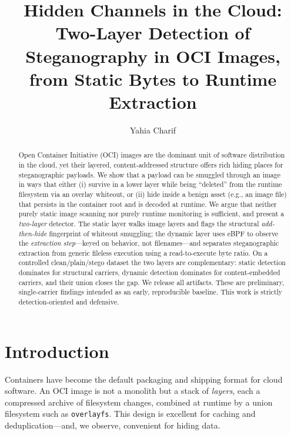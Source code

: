 \documentclass[sigconf,nonacm]{acmart}
\begin{document}
\title{Hidden Channels in the Cloud: Two-Layer Detection of\\
Steganography in OCI Images, from Static Bytes to Runtime Extraction}

\author{Yahia Charif}

\begin{abstract}
Open Container Initiative (OCI) images are the dominant unit of software
distribution in the cloud, yet their layered, content-addressed structure
offers rich hiding places for steganographic payloads. We show that a payload
can be smuggled through an image in ways that either (i) survive in a
lower layer while being ``deleted'' from the runtime filesystem via an overlay
whiteout, or (ii) hide inside a benign asset (e.g., an image file) that persists
in the container root and is decoded at runtime. We argue that neither purely
static image scanning nor purely runtime monitoring is sufficient, and present a
\emph{two-layer} detector. The static layer walks image layers and flags the
structural \emph{add-then-hide} fingerprint of whiteout smuggling; the dynamic
layer uses eBPF to observe the \emph{extraction step}---keyed on behavior, not
filenames---and separates steganographic extraction from generic fileless
execution using a read-to-execute byte ratio. On a controlled clean/plain/stego
dataset the two layers are complementary: static detection dominates for
structural carriers, dynamic detection dominates for content-embedded carriers,
and their union closes the gap. We release all artifacts. These are preliminary,
single-carrier findings intended as an early, reproducible baseline. This work is
strictly detection-oriented and defensive.
\end{abstract}


\maketitle

\section{Introduction}
Containers have become the default packaging and shipping format for cloud
software. An OCI image is not a monolith but a stack of \emph{layers}, each a
compressed archive of filesystem changes, combined at runtime by a union
filesystem such as \texttt{overlayfs}. This design is excellent for caching and
deduplication---and, we observe, convenient for hiding data.
\end{document}
